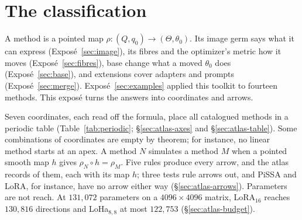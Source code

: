 \section{The classification}\label{sec:atlas}

A method is a pointed map $\rho:(Q,q_0)\to(\Theta,\theta_0)$. Its image germ says what it can express
(Exposé~\ref{sec:image}), its fibres and the optimizer's metric how it moves (Exposé~\ref{sec:fibres}), base change what
a moved $\theta_0$ does (Exposé~\ref{sec:base}), and extensions cover adapters and prompts (Exposé~\ref{sec:merge}).
Exposé~\ref{sec:examples} applied this toolkit to fourteen methods. This exposé turns the answers into coordinates and
arrows.

Seven coordinates, each read off the formula, place all \nMethods{} catalogued methods in a periodic table
(Table~\ref{tab:periodic};
\S\ref{sec:atlas-axes} and \S\ref{sec:atlas-table}). Some combinations of coordinates are empty by theorem; for
instance, no linear method starts at an apex. A method $N$ simulates a method $M$ when a pointed smooth map $h$ gives $\rho_N\circ h=\rho_M$.
Five rules produce every arrow, and the atlas records \nArrows{} of them, each with its map $h$; three tests rule arrows
out, and PiSSA and LoRA, for instance, have no arrow either way (\S\ref{sec:atlas-arrows}). Parameters are not reach. At
$131{,}072$ parameters on a $4096\times4096$ matrix, LoRA$_{16}$ reaches $130{,}816$ directions and LoHa$_{8,8}$ at most
$122{,}753$ (\S\ref{sec:atlas-budget}).

\newsavebox{\fbAtlasPeriodicBox}%
\begin{table}[!tbp]
\centering
\caption{The periodic table of the \nCore{} core methods. Rows are kinds (axis~1 of \S\ref{sec:atlas-axes}), with
reparametrisations split by how they couple to $W_0$: additively, by a group action, by a Hadamard product or by
selecting coordinates. Columns are the shapes of the image germ (axis~2). A dot marks an empty cell. All seven
coordinates of the methods named here are in Table~\ref{tab:periodic-methods}, and those of every catalogued method in
Table~\ref{tab:catalogue}.}\label{tab:periodic}
%
\ifdim\dimexpr(\ht\fbAtlasPeriodicBox+\dp\fbAtlasPeriodicBox)*100/130\relax>0.86\textheight
  \resizebox*{!}{0.86\textheight}{\usebox{\fbAtlasPeriodicBox}}%
\else
  \resizebox{\linewidth}{!}{\usebox{\fbAtlasPeriodicBox}}%
\fi
\end{table}

